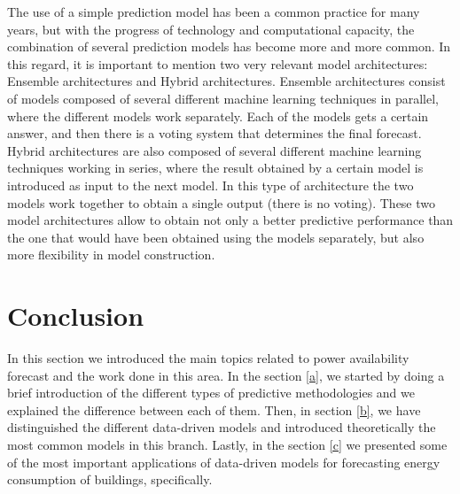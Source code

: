 The use of a simple prediction model has been a common practice for many years, but with the progress of technology and computational capacity, the combination of several prediction models has become more and more common. In this regard, it is important to mention two very relevant model architectures: Ensemble architectures and Hybrid architectures. Ensemble architectures consist of models composed of several different machine learning techniques in parallel, where the different models work separately. Each of the models gets a certain answer, and then there is a voting system that determines the final forecast. Hybrid architectures are also composed of several different machine learning techniques working in series, where the result obtained by a certain model is introduced as input to the next model. In this type of architecture the two models work together to obtain a single output (there is no voting). These two model architectures allow to obtain not only a better predictive performance than the one that would have been obtained using the models separately, but also more flexibility in model construction.


\section{Conclusion}

In this section we introduced the main topics related to power availability forecast and the work done in this area. In the section \ref{a}, we started by doing a brief introduction of the different types of predictive methodologies and we explained the difference between each of them. Then, in section \ref{b}, we have distinguished the different data-driven models and introduced theoretically the most common models in this branch. Lastly, in the section \ref{c} we presented some of the most important applications of data-driven models for forecasting energy consumption of buildings, specifically.
